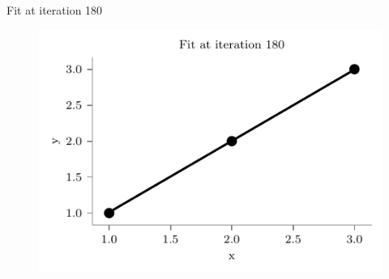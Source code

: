 \documentclass{beamer}
\begin{document}
\begin{frame}{Fit at iteration 180}
\begin{figure}
	\centering
	\includegraphics[width=0.7\linewidth]{gradient-descent/fit-iteration-180.pdf}
\end{figure}
\end{frame}

%		
%		
%		

	

	
	
	

	
\end{document}
